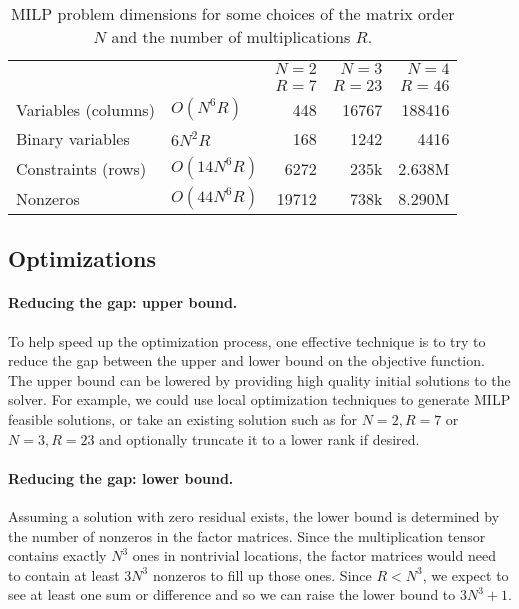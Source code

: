 \documentclass{article}
\begin{document}
\begin{table}[h]
\centering
\begin{tabular}{l l r r r}
                           &               & $N=2$ & $N=3$ & $N=4$ \\
                           &               & $R=7$ & $R=23$ & $R=46$ \\
\hline Variables (columns) & $O(N^6 R)$    &  448 &  16767 &  188416 \\
Binary variables           & $6 N^2 R$     &  168 &   1242 &    4416 \\
Constraints (rows)         & $O(14 N^6 R)$ & 6272 & 235k & 2.638M \\
Nonzeros                   & $O(44 N^6 R)$ & 19712 & 738k  & 8.290M 
\end{tabular}
\caption{MILP problem dimensions for some choices of the matrix order $N$ and the number of multiplications $R$.}
\label{tbl:dim}
\end{table}

\subsection{Optimizations}

\paragraph{Reducing the gap: upper bound.} To help speed up the optimization process, one effective technique is to try to reduce the gap between the upper and lower bound on the objective function. The upper bound can be lowered by providing high quality initial solutions to the solver. For example, we could use local optimization techniques to generate MILP feasible solutions, or take an existing solution such as for $N=2,R=7$ or $N=3,R=23$ and optionally truncate it to a lower rank if desired.

\paragraph{Reducing the gap: lower bound.} Assuming a solution with zero residual exists, the lower bound is determined by the number of nonzeros in the factor matrices. Since the multiplication tensor contains exactly $N^3$ ones in nontrivial locations, the factor matrices would need to contain at least $3N^3$ nonzeros to fill up those ones. Since $R < N^3$, we expect to see at least one sum or difference and so we can raise the lower bound to $3N^3+1$.
\end{document}
